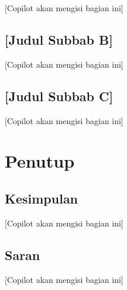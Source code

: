 \documentclass[12pt,a4paper]{article}
\begin{document}
[Copilot akan mengisi bagian ini]

\subsection{[Judul Subbab B]}

[Copilot akan mengisi bagian ini]

\subsection{[Judul Subbab C]}

[Copilot akan mengisi bagian ini]

\section{Penutup}

\subsection{Kesimpulan}

[Copilot akan mengisi bagian ini]

\subsection{Saran}

[Copilot akan mengisi bagian ini]



\end{document}
